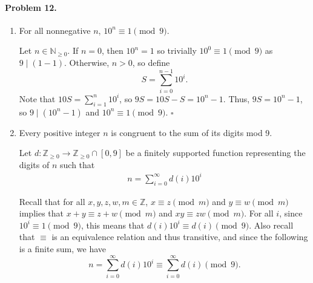 \documentclass[12pt]{article}
\begin{document}
\paragraph{Problem 12.}
\begin{enumerate}
    \item[a.] For all nonnegative $n$, $10^n \equiv 1 \pmod 9$.
    
    Let $n \in \mathbb N_{\ge0}$. If $n = 0$, then $10^n = 1$ so trivially $10^0 \equiv 1 \pmod 9$ as $9 \mid (1 - 1)$. Otherwise, $n > 0$, so define \[S = \sum_{i= 0}^{n-1} 10^i. \]
    Note that $10S = \sum_{i=1}^{n} 10^i$, so $9S = 10S - S = 10^n - 1$. Thus, $9 S = 10^n - 1$, so $9 \mid (10^n - 1)$ and $10^n \equiv 1 \pmod 9$. $\square$

    \item[b.] Every positive integer $n$ is congruent to the sum of its digits mod 9. 
    
    Let $d : \mathbb Z_{\ge 0} \to \mathbb Z_{\ge 0} \cap [0, 9]$ be a finitely supported function representing the digits of $n$ such that
    \begin{align*}
        n = \sum_{i = 0}^\infty d(i) 10^i
    \end{align*}

    Recall that for all $x,y,z,w,m \in \mathbb Z$, $x \equiv z \pmod m$ and $y \equiv w \pmod m$ implies that $x + y \equiv z + w \pmod m$ and $xy \equiv zw \pmod m$. For all $i$, since $10^i \equiv 1 \pmod 9$, this means that $d(i)10^i \equiv d(i) \pmod 9$. Also recall that $\equiv$ is an equivalence relation and thus transitive, and since the following is a finite sum, we have
    \[n = \sum_{i=0}^\infty d(i)10^i \equiv \sum_{i=0}^\infty d(i) \pmod 9.\]
\end{enumerate}
\end{document}

